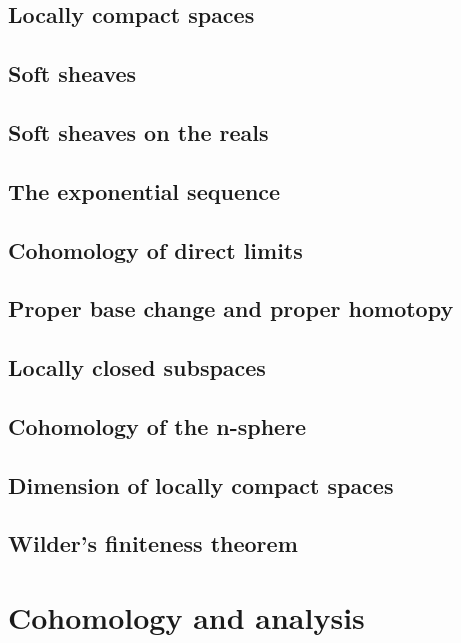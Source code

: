 \documentclass[5pt]{article}
\theoremstyle{definition}
\theoremstyle{remark}
\begin{document}
	\subsection{Locally compact spaces}
	
	\subsection{Soft sheaves}
	
	\subsection{Soft sheaves on the reals}
	
	\subsection{The exponential sequence}
	
	\subsection{Cohomology of direct limits}
	
	\subsection{Proper base change and proper homotopy}
	
	\subsection{Locally closed subspaces}
	
	\subsection{Cohomology of the n-sphere}
	
	\subsection{Dimension of locally compact spaces}
	
	\subsection{Wilder's finiteness theorem}
	
	\newpage
	
	\section{Cohomology and analysis}
	
\end{document}

